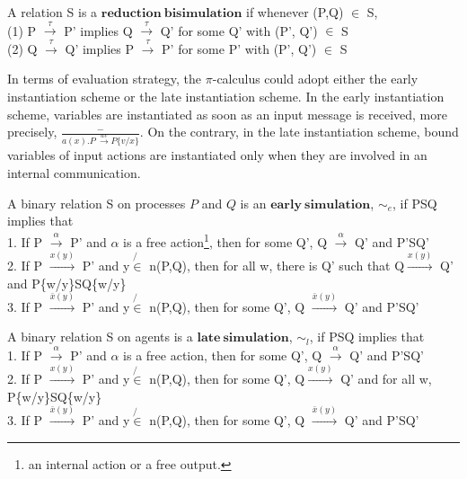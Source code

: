 \begin{defn}
A relation S is a $\mathbf{reduction\ bisimulation}$ if whenever (P,Q) $\in$ S,\\
(1) P $\overset{\tau}{\longrightarrow}$ P' implies Q $\overset{\tau}{\longrightarrow}$ Q' for some Q' with (P', Q') $\in$ S \\
(2) Q $\overset{\tau}{\longrightarrow}$ Q' implies P $\overset{\tau}{\longrightarrow}$ P' for some P' with (P', Q') $\in$ S
\end{defn}

In terms of evaluation strategy, the $\pi$-calculus could adopt either the early instantiation scheme or the late instantiation scheme.  In the early instantiation scheme, variables are instantiated as soon as an input message is received, more precisely, $\frac{-}{a(x).P\ \overset{av}{\longrightarrow}P\{v/x\}}$.  On the contrary, in the late instantiation scheme, bound variables of input actions are instantiated only when they are involved in an internal communication.

\begin{defn}
A binary relation S on processes $P$ and $Q$ is an $\mathbf{early\ simulation}$, $\sim_e$,  if PSQ implies that\\
1. If P $\overset{\alpha}{\longrightarrow}$ P' and $\alpha$ is a free action\footnote{an internal action or a free output.}, then for some Q', Q $\overset{\alpha}{\longrightarrow}$ Q' and P'SQ'\\
2. If P $\overset{x(y)}{\longrightarrow}$ P' and y$\not{\in}$ n(P,Q), then for all w, there is Q' such that Q$\overset{x(y)}{\longrightarrow}$ Q' and P\{w/y\}SQ\{w/y\}\\
3. If P $\overset{\bar{x}(y)}{\longrightarrow}$ P' and y$\not{\in}$ n(P,Q), then for some Q', Q $\overset{\bar{x}(y)}{\longrightarrow}$ Q' and P'SQ'
\end{defn}

\begin{defn}
A binary relation S on agents is a $\mathbf{late \ simulation}$, $\sim_l$,  if PSQ implies that\\
1. If P $\overset{\alpha}{\longrightarrow}$ P' and $\alpha$ is a free action, then for some Q', Q $\overset{\alpha}{\longrightarrow}$ Q' and P'SQ'\\
2. If P $\overset{x(y)}{\longrightarrow}$ P' and y$\not{\in}$ n(P,Q), then for some Q', Q$\overset{x(y)}{\longrightarrow}$ Q' and for all w, P\{w/y\}SQ\{w/y\}\\
3. If P $\overset{\bar{x}(y)}{\longrightarrow}$ P' and y$\not{\in}$ n(P,Q), then for some Q', Q $\overset{\bar{x}(y)}{\longrightarrow}$ Q' and P'SQ'
\end{defn}

